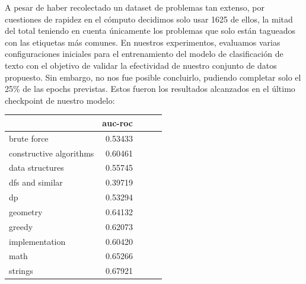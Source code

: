 \documentclass{article}
\begin{document}
    A pesar de haber recolectado un dataset de problemas tan extenso, por cuestiones de 
    rapidez en el cómputo decidimos solo usar 1625 de ellos, la mitad 
    del total teniendo en cuenta únicamente los problemas que solo están 
    tagueados con las etiquetas más comunes. En nuestros experimentos, evaluamos varias configuraciones 
    iniciales para el entrenamiento del modelo de clasificación de texto con el objetivo de 
    validar la efectividad de nuestro conjunto de datos propuesto. Sin embargo, no nos fue posible 
    concluirlo, pudiendo completar solo el 25\% de las epochs previstas. Estos fueron los resultados 
    alcanzados en el último checkpoint de nuestro modelo:

    \begin{tabular}{lrrrr}
        \toprule
        {}                      & auc-roc  \\
        \midrule
        brute force             & 0.53433  \\
        constructive algorithms & 0.60461  \\
        data structures         & 0.55745  \\
        dfs and similar         & 0.39719  \\
        dp                      & 0.53294  \\
        geometry                & 0.64132  \\
        greedy                  & 0.62073  \\
        implementation          & 0.60420  \\
        math                    & 0.65266  \\
        strings                 & 0.67921  \\
        \bottomrule
    \end{tabular}
\end{document}

